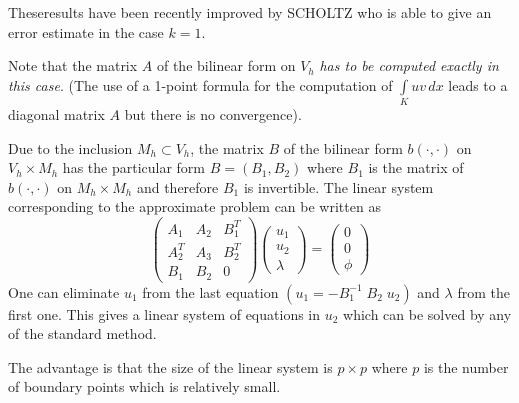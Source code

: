 These\pageoriginale results have been recently improved by SCHOLTZ
\cite{key41} who is able to give an error estimate in the case $k=1$. 

Note that the matrix $A$ of the bilinear form on $V_h$ \emph{has to be
computed exactly in this case}. (The use of a 1-point formula for the
computation of $\int\limits_K uv\,dx$ leads to a diagonal matrix $A$ but
there is no convergence). 

\begin{REM}\label{chap7:rem7}
Due to the inclusion $M_h\subset V_h$, the matrix $B$ of the bilinear
form $b(\cdotp,\cdotp)$ on $V_h\times M_h$ has the particular form
$B=(B_1, B_2)$ where $B_1$ is the matrix of $b(\cdotp,\cdotp)$ on
$M_h\times M_h$ and therefore $B_1$ is invertible. The linear system
corresponding to the approximate problem can be written as 
\begin{equation*}
\begin{pmatrix}
A_1 & A_2 & B_1^T\\
A_2^T & A_3 & B_2^T\\
B_1 & B_2 & 0
\end{pmatrix}
\begin{pmatrix}
u_1\\
u_2\\
\lambda
\end{pmatrix}
=
\begin{pmatrix}
0\\
0\\
\phi
\end{pmatrix}
\end{equation*}
One can eliminate $u_1$ from the last equation
$(u_1=-B_1^{-1}\;B_2\;u_2)$ and $\lambda$ from the first one. This
gives a linear system of equations in $u_2$ which can be solved by any
of the standard method.

The advantage is that the size of the linear system is $p\times p$
where $p$ is the number of boundary points which is relatively small. 
\end{REM}

